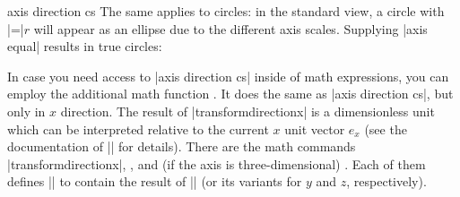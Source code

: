 \begin{coordinatesystem}{axis direction cs}
    The same applies to circles: in the standard view, a circle with
    |=|$r$ will appear as an ellipse due to the
    different axis scales. Supplying |axis equal| results in true circles:
\begin{codeexample}[]
\end{codeexample}
\begin{codeexample}[]
\end{codeexample}

    In case you need access to |axis direction cs| inside of math expressions,
    you can employ the additional math function
    . It does the same as
    |axis direction cs|, but only in $x$ direction. The result of
    |transformdirectionx| is a dimensionless unit which can be interpreted
    relative to the current \pgfname{} $x$ unit vector $e_x$ (see the
    documentation of |\pgfplotstransformdirectionx| for details). There are the
    math commands |transformdirectionx|, ,
    and (if the axis is three-dimensional)
    . Each of them defines
    |\pgfmathresult| to contain the result of |\pgfplotstransformdirectionx|
    (or its variants for $y$ and $z$, respectively).
\end{coordinatesystem}

